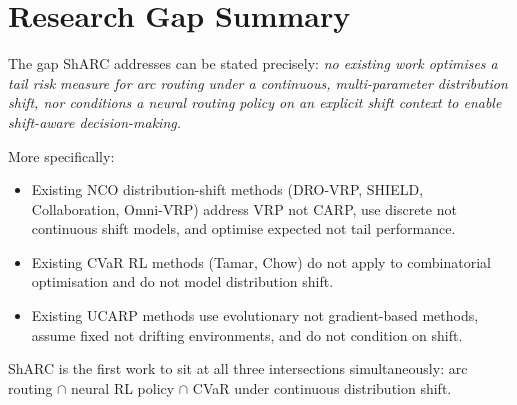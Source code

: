 \documentclass[11pt]{article}
\begin{document}
\section{Research Gap Summary}

The gap ShARC addresses can be stated precisely: \emph{no existing work
optimises a tail risk measure for arc routing under a continuous,
multi-parameter distribution shift, nor conditions a neural routing policy
on an explicit shift context to enable shift-aware decision-making.}

More specifically:
\begin{itemize}
    \item Existing NCO distribution-shift methods (DRO-VRP, SHIELD,
    Collaboration, Omni-VRP) address VRP not CARP, use discrete not
    continuous shift models, and optimise expected not tail performance.
    \item Existing CVaR RL methods (Tamar, Chow) do not apply to
    combinatorial optimisation and do not model distribution shift.
    \item Existing UCARP methods use evolutionary not gradient-based methods,
    assume fixed not drifting environments, and do not condition on shift.
\end{itemize}

ShARC is the first work to sit at all three intersections simultaneously:
arc routing $\cap$ neural RL policy $\cap$ CVaR under continuous distribution
shift.
\end{document}

